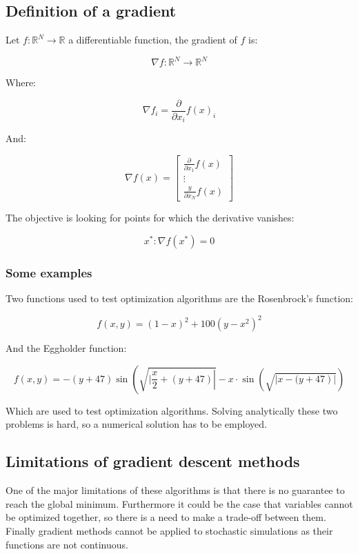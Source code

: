   \subsection{Definition of a gradient}
  Let $f: \mathbb{R}^N \rightarrow \mathbb{R}$ a differentiable function, the gradient of $f$ is:

  $$\nabla f: \mathbb{R}^N \rightarrow \mathbb{R}^N$$

  Where:

  $$\nabla f_i=\frac{\partial}{\partial x_i} f(x)_i$$

  And:

  $$\nabla f(x) =\left[\begin{array}{c}\frac{\partial}{\partial x_1} f(x) \\ \vdots \\ \frac{y}{\partial x_N} f(x)\end{array}\right]$$

  The objective is looking for points for which the derivative vanishes:

  $$x^* : \nabla f(x^*)=0$$

    \subsubsection{Some examples}
    Two functions used to test optimization algorithms are the Rosenbrock's function:

    $$f(x, y)=(1-x)^2+100\left(y-x^2\right)^2$$

    And the Eggholder function:

    $$f(x, y)=-(y+47) \sin \left(\sqrt{\left.\mid \frac{x}{2}+(y+47)\right|}-\right. x \cdot \sin \left(\sqrt{\left.\mid x-(y+47\right)|}\right)$$

      Which are used to test optimization algorithms.
      Solving analytically these two problems is hard, so a numerical solution has to be employed.

  \subsection{Limitations of gradient descent methods}
  One of the major limitations of these algorithms is that there is no guarantee to reach the global minimum.
  Furthermore it could be the case that variables cannot be optimized together, so there is a need to make a trade-off between them.
  Finally gradient methods cannot be applied to stochastic simulations as their functions are not continuous.


